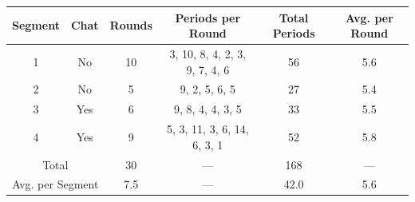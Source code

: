 \begingroup
\centering
\small
\begin{tabular}{cccccc}
\toprule
Segment & Chat & Rounds & Periods per Round & Total Periods & Avg. per Round \\
\midrule
  1 & No & 10 & 3, 10, 8, 4, 2, 3, 9, 7, 4, 6 & 56 & 5.6 \\
  2 & No & 5 & 9, 2, 5, 6, 5 & 27 & 5.4 \\
  3 & Yes & 6 & 9, 8, 4, 4, 3, 5 & 33 & 5.5 \\
  4 & Yes & 9 & 5, 3, 11, 3, 6, 14, 6, 3, 1 & 52 & 5.8 \\
\midrule
 \multicolumn{2}{c}{Total}  & 30 & --- & 168 & --- \\
 \multicolumn{2}{c}{ Avg. per Segment} & 7.5 & --- & 42.0 & 5.6 \\
\bottomrule
\end{tabular}
\endgroup
